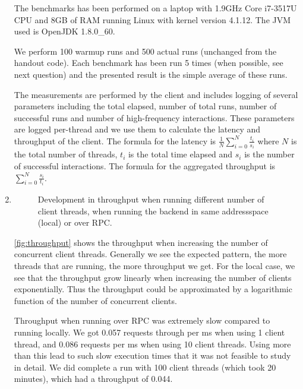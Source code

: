 \documentclass[11pt,a4paper,english]{article}
\begin{document}
\begin{enumerate}
  The benchmarks has been performed on a laptop with 1.9GHz Core i7-3517U CPU and
  8GB of RAM running Linux with kernel version 4.1.12. The JVM used is OpenJDK
  1.8.0\_60.

  We perform 100 warmup runs and 500 actual runs (unchanged from the handout
  code). Each benchmark has been run 5 times (when possible, see next question)
  and the presented result is the simple average of these runs.

  The measurements are performed by the client and includes logging of several
  parameters including the total elapsed, number of total runs, number of
  successful runs and number of high-frequency interactions. These parameters
  are logged per-thread and we use them to calculate the latency and throughput
  of the client. The formula for the latency is
  $\frac{1}{N}\sum_{i=0}^N\frac{t_i}{s_i}$ where $N$ is the total number of
  threads, $t_i$ is the total time elapsed and $s_i$ is the number of successful
  interactions. The formula for the aggregated throughput is
  $\sum_{i=0}^N\frac{s_i}{t_i}$.



\item


\begin{figure}[H]
  \centering
  \caption{Development in throughput when running different number of
    client threads, when running the backend in same addressspace (local) or
    over RPC.}
  \label{fig:throughput}
\end{figure}

\autoref{fig:throughput} shows the throughput when increasing the number of
concurrent client threads. Generally we see the expected pattern, the more
threads that are running, the more throughput we get. For the local case, we see
that the throughput grow linearly when increasing the number of clients
exponentially. Thus the throughput could be approximated by a logarithmic
function of the number of concurrent clients.

Throughput when running over RPC was extremely slow compared to running
locally. We got 0.057 requests through per ms when using 1 client thread, and
0.086 requests per ms when using 10 client threads. Using more than this lead to
such slow execution times that it was not feasible to study in detail. We did
complete a run with 100 client threads (which took 20 minutes), which had a
throughput of 0.044.


\end{enumerate}
\end{document}
